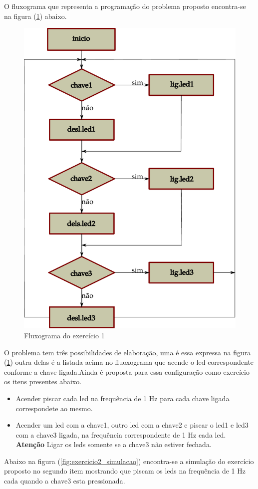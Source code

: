 \documentclass{Fabiano_file}
\begin{document}
O fluxograma que representa a programação do problema proposto encontra-se na figura (\ref{fig:fluxograma_exercicio1}) abaixo.

\begin{figure}[h!]
\centering
\includegraphics[width=.5\textwidth]{fluxograma_exercicio1.pdf}
\caption{Fluxograma do exercício 1}
\label{fig:fluxograma_exercicio1}
\end{figure}

O problema tem três possibilidades de elaboração, uma é essa expressa na figura (\ref{fig:fluxograma_exercicio1}) outra delas é a listada acima no fluoxograma
que acende o led correspondente conforme a chave ligada.Ainda é proposta para essa configuração como exercício os itens presentes abaixo.

\begin{itemize}
 \item Acender piscar cada led na frequência de 1 Hz para cada chave ligada correspondete ao mesmo.
 \item Acender um led com a chave1, outro led com a chave2 e piscar o led1 e led3 com a chave3 ligada, na frequência correspondente de 1 Hz cada led.
 \textbf{Atenção} Ligar os leds somente se a chave3 não estiver fechada.
 \end{itemize}

 
 \pagebreak
 
 Abaixo na figura (\ref{fig:exercicio2_simulacao}) encontra-se a simulação do exercício proposto no segundo item mostrando que piscam os leds na frequência de 
 1 Hz cada quando a chave3 esta pressionada. 
 
\end{document}

